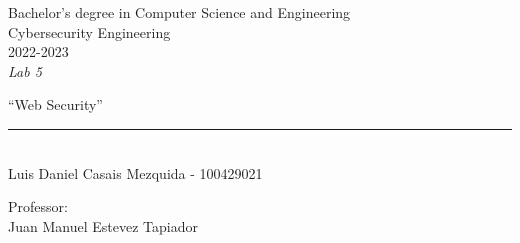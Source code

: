 \begin{titlepage}
    \begin{sffamily}
    \color{azulUC3M}
    \begin{center}
        \begin{figure}[H]
        \end{figure}
        \vspace{1.5cm}
        \begin{Large}
            Bachelor's degree in Computer Science and Engineering\\
            Cybersecurity Engineering\\
            2022-2023\\
            \vspace{2cm}
            \textsl{Lab 5}
            \bigskip

        \end{Large}
            {\Huge ``Web Security''}\\
            \vspace*{0.5cm}
            \rule{10.5cm}{0.1mm}\\
            \vspace*{0.9cm}
            {\LARGE Luis Daniel Casais Mezquida - 100429021}\\
            \vspace*{0.2cm}

            \vspace*{0.8cm}
        \begin{Large}
            Professor:\\
            Juan Manuel Estevez Tapiador\\
        \end{Large}
    \end{center}
    \vfill

    \end{sffamily}
\end{titlepage}
